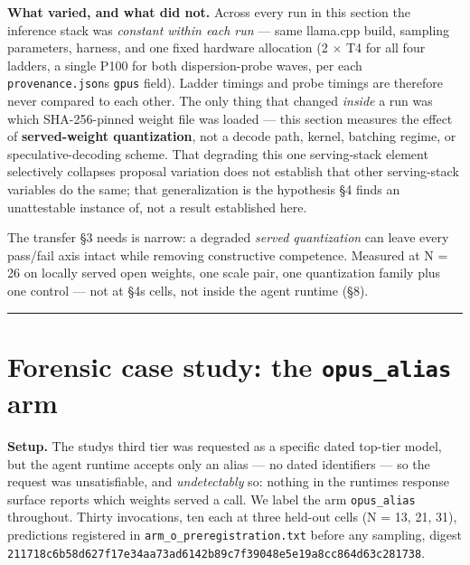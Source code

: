 \textbf{What varied, and what did not.} Across every run in this section the inference stack was \emph{constant within each run} --- same llama.cpp build, sampling parameters, harness, and one fixed hardware allocation (2 \(\times\) T4 for all four ladders, a single P100 for both dispersion-probe waves, per each \texttt{provenance.json}\textquotesingle s \texttt{gpus} field). Ladder timings and probe timings are therefore never compared to each other. The only thing that changed \emph{inside} a run was which SHA-256-pinned weight file was loaded --- this section measures the effect of \textbf{served-weight quantization}, not a decode path, kernel, batching regime, or speculative-decoding scheme. That degrading this one serving-stack element selectively collapses proposal variation does not establish that other serving-stack variables do the same; that generalization is the hypothesis §4 finds an unattestable instance of, not a result established here.

The transfer §3 needs is narrow: a degraded \emph{served quantization} can leave every pass/fail axis intact while removing constructive competence. Measured at N = 26 on locally served open weights, one scale pair, one quantization family plus one control --- not at §4\textquotesingle s cells, not inside the agent runtime (§8).

\begin{center}\rule{0.5\linewidth}{0.5pt}\end{center}

\hypertarget{forensic-case-study-the-opus_alias-arm}{%
\section{\texorpdfstring{Forensic case study: the \texttt{opus\_alias} arm}{Forensic case study: the opus\_alias arm}}\label{forensic-case-study-the-opus_alias-arm}}

\textbf{Setup.} The study\textquotesingle s third tier was requested as a specific dated top-tier model, but the agent runtime accepts only an alias --- no dated identifiers --- so the request was unsatisfiable, and \emph{undetectably} so: nothing in the runtime\textquotesingle s response surface reports which weights served a call. We label the arm \texttt{opus\_alias} throughout. Thirty invocations, ten each at three held-out cells (N = 13, 21, 31), predictions registered in \texttt{arm\_o\_preregistration.txt} before any sampling, digest \texttt{211718c6b58d627f17e34aa73ad6142b89c7f39048e5e19a8cc864d63c281738}.

